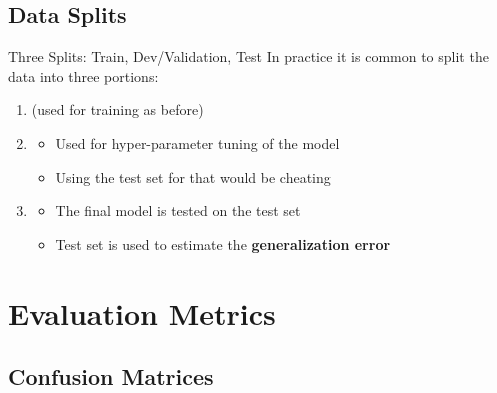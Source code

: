 \subsection{Data Splits}

\begin{frame}{Three Splits: Train, Dev/Validation, Test}{}\important
	In practice it is common to split the data into three portions:
	\vspace*{3mm}
	\begin{boxBlueNoFrame}
		\begin{enumerate}
			\item {} {\footnotesize (used for training as before)}
			\item {}
			\begin{itemize}
				\item Used for hyper-parameter tuning of the model
				\item Using the test set for that would be cheating
			\end{itemize}
			\item {}
			\begin{itemize}
				\item The final model is tested on the test set
				\item Test set is used to estimate the \textbf{generalization error}
			\end{itemize}
		\end{enumerate}
	\end{boxBlueNoFrame}
\end{frame}


\section{Evaluation Metrics}

\subsection{Confusion Matrices}


